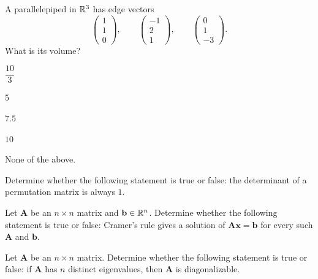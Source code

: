 \begin{problem}
A parallelepiped in $\mathbb{R}^3$ has edge vectors
\[
\begin{pmatrix}1\\1\\0\end{pmatrix},
\qquad
\begin{pmatrix}-1\\2\\1\end{pmatrix},
\qquad
\begin{pmatrix}0\\1\\-3\end{pmatrix}.
\]
What is its volume?
\begin{problemchoices}
\item $\dfrac{10}{3}$
\item $5$
\item $7.5$
\item $10$
\item None of the above.
\end{problemchoices}
\end{problem}

\begin{problem}
Determine whether the following statement is true or false: the determinant of a permutation matrix is always $1$.
\end{problem}

\begin{problem}
Let $\mathbf A$ be an $n\times n$ matrix and $\mathbf b\in\mathbb{R}^n$. Determine whether the following statement is true or false: Cramer's rule gives a solution of $\mathbf A\mathbf x=\mathbf b$ for every such $\mathbf A$ and $\mathbf b$.
\end{problem}

\begin{problem}
Let $\mathbf A$ be an $n\times n$ matrix. Determine whether the following statement is true or false: if $\mathbf A$ has $n$ distinct eigenvalues, then $\mathbf A$ is diagonalizable.
\end{problem}

